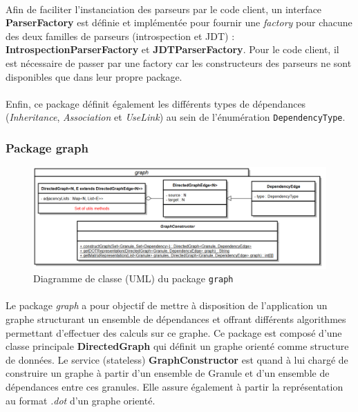 \documentclass{scrartcl}
\begin{document}
	\paragraph{} Afin de faciliter l'instanciation des parseurs par le code client, un interface \textbf{ParserFactory} est définie et implémentée pour fournir une \emph{factory} pour chacune des deux familles de parseurs (introspection et JDT) : \textbf{IntrospectionParserFactory} et \textbf{JDTParserFactory}. Pour le code client, il est nécessaire de passer par une factory car les constructeurs des parseurs ne sont disponibles que dans leur propre package.
	
	\paragraph{} Enfin, ce package définit également les différents types de dépendances (\emph{Inheritance}, \emph{Association} et \emph{UseLink}) au sein de l'énumération \texttt{DependencyType}.
    
\subsubsection{Package graph}
    \begin{figure}[h!]
        \centering
        \includegraphics[width=\textwidth]{img/uml/graph.png}
        \caption{Diagramme de classe (UML) du package \texttt{graph}}
    \end{figure}

    \paragraph{}Le package \emph{graph} a pour objectif de mettre à disposition de l’application un graphe structurant un ensemble de dépendances et offrant différents algorithmes permettant d’effectuer des calculs sur ce graphe. Ce package est composé d’une classe principale \textbf{DirectedGraph} qui définit un graphe orienté comme structure de données.
    Le service (stateless) \textbf{GraphConstructor} est quand à lui chargé de construire un graphe à partir d’un ensemble de Granule et d’un ensemble de dépendances entre ces granules. Elle assure également à partir  la représentation au format \emph{.dot} d'un graphe orienté.
    
\end{document}
